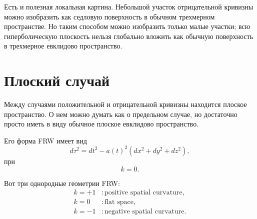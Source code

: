 \begin{classroomqa}
\end{classroomqa}

\begin{classroomqa}
\end{classroomqa}

\begin{classroomqa}
\end{classroomqa}

Есть и полезная локальная картина. Небольшой участок отрицательной кривизны можно изобразить как седловую поверхность в обычном трехмерном пространстве. Но таким способом можно изобразить только малые участки; всю гиперболическую плоскость нельзя глобально вложить как обычную поверхность в трехмерное евклидово пространство.

\section{Плоский случай}

Между случаями положительной и отрицательной кривизны находится плоское пространство. О нем можно думать как о предельном случае, но достаточно просто иметь в виду обычное плоское евклидово пространство.

Его форма FRW имеет вид
\begin{equation}
d\tau^2=dt^2-a(t)^2\left(dx^2+dy^2+dz^2\right),
\end{equation}
при
\begin{equation}
k=0.
\end{equation}

Вот три однородные геометрии FRW:
\begin{align}
k=+1 &: \text{positive spatial curvature},\\
k=0 &: \text{flat space},\\
k=-1 &: \text{negative spatial curvature}.
\end{align}

